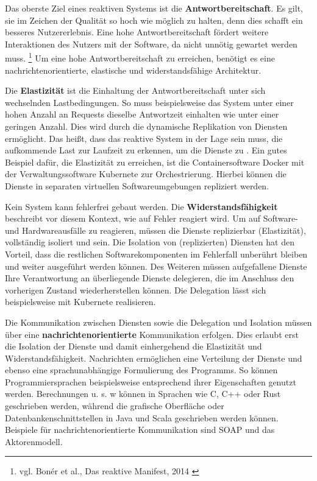 Das oberste Ziel eines reaktiven Systems ist die \textbf{Antwortbereitschaft}. Es gilt, sie im Zeichen der Qualität so hoch wie möglich zu halten, denn dies schafft ein besseres Nutzererlebnis. Eine hohe Antwortbereitschaft fördert weitere Interaktionen des Nutzers mit der Software, da nicht unnötig gewartet werden muss. 
\footnote{vgl. Bonér et al., Das reaktive Manifest, 2014 \cite{web:site:das_reaktive_manifest} \label{reactive_manifesto}}
Um eine hohe Antwortbereitschaft zu erreichen, benötigt es eine nachrichtenorientierte, elastische und widerstandsfähige Architektur.

Die \textbf{Elastizität} ist die Einhaltung der Antwortbereitschaft unter sich wechselnden Lastbedingungen. So muss beispielsweise das System unter einer hohen Anzahl an Requests dieselbe Antwortzeit einhalten wie unter einer geringen Anzahl. Dies wird durch die dynamische \gls{Replikation} von Diensten ermöglicht. Das heißt, dass das reaktive System in der Lage sein muss, die aufkommende Last zur Laufzeit zu erkennen, um die Dienste zu .
Ein gutes Beispiel dafür, die Elastizität zu erreichen, ist die Containersoftware Docker mit der Verwaltungssoftware Kubernete zur Orchestrierung. Hierbei können die Dienste in separaten virtuellen Softwareumgebungen repliziert werden.

Kein System kann fehlerfrei gebaut werden. Die \textbf{Widerstandsfähigkeit} beschreibt vor diesem Kontext, wie auf Fehler reagiert wird. Um auf Software- und Hardwareausfälle zu reagieren, müssen die Dienste replizierbar (Elastizität), vollständig isoliert und  sein. Die Isolation von (replizierten) Diensten hat den Vorteil, dass die restlichen Softwarekomponenten im Fehlerfall unberührt bleiben und weiter ausgeführt werden können. Des Weiteren müssen aufgefallene Dienste Ihre Verantwortung an überliegende Dienste delegieren, die im Anschluss den vorherigen Zustand wiederherstellen können. 
Die Delegation lässt sich beispielsweise mit Kubernete realisieren.

Die Kommunikation zwischen Diensten sowie die Delegation und Isolation müssen über eine \textbf{nachrichtenorientierte} Kommunikation erfolgen. Dies erlaubt erst die Isolation der Dienste und damit einhergehend die Elastizität und Widerstandsfähigkeit. Nachrichten ermöglichen eine Verteilung der Dienste und ebenso eine sprachunabhängige Formulierung des Programms. 
So können Programmiersprachen beispielsweise entsprechend ihrer Eigenschaften genutzt werden. Berechnungen u. s. w können in Sprachen wie C, C++ oder Rust geschrieben werden, während die grafische Oberfläche oder Datenbankenschnittstellen in Java und Scala geschrieben werden können. Beispiele für nachrichtenorientierte Kommunikation sind SOAP und das Aktorenmodell.

